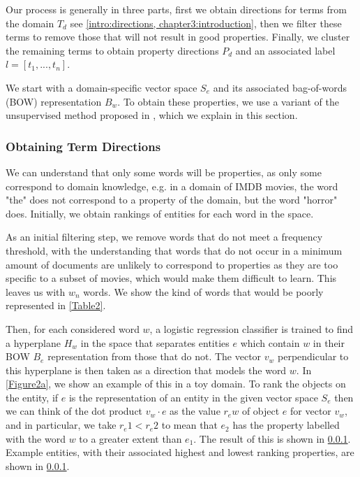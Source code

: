 Our process is generally in three parts, first we obtain directions for terms from the domain $T_d$ see \ref{intro:directions, chapter3:introduction}, then we filter these terms to remove those that will not result in good properties. Finally, we cluster the remaining terms to obtain property directions $P_d$ and an associated label $l = [t_1, ..., t_n]$. 





We start with a domain-specific vector space $S_e$ and its associated bag-of-words (BOW) representation $B_w$. To obtain these properties, we use a variant of the unsupervised method proposed in \cite{derracAIJ}, which we explain in this section. 
\subsubsection{Obtaining Term Directions}
We can understand that only some words will be properties, as only some correspond to domain knowledge, e.g. in a domain of IMDB movies, the word "the" does not correspond to a property of the domain, but the word "horror" does. Initially, we obtain rankings of entities for each word in the space. 

As an initial filtering step, we remove words that do not meet a frequency threshold, with the understanding that words that do not occur in a minimum amount of documents are unlikely to correspond to properties as they are too specific to a subset of movies, which would make them difficult to learn. This leaves us with $w_n$ words. We show the kind of words that would be poorly represented  in \ref{Table2}.%

Then, for each considered word $w$, a logistic regression classifier is trained to find a hyperplane $H_w$ in the space that separates entities $e$ which contain $w$ in their BOW $B_e$ representation from those that do not. %
The vector $v_w$ perpendicular to this hyperplane is then taken as a direction that models the word $w$. In \ref{Figure2a}, we show an example of this in a toy domain. %
To rank the objects on the entity, if $e$ is the representation of an entity in the given vector space $S_e$ then we can think of the dot product $v_w \cdot e$ as the value $r_ew$ of object $e$ for vector $v_w$, and in particular, we take $r_e1 < r_e2$ to mean that $e_2$ has the property labelled with the word $w$ to a greater extent than $e_1$. The result of this is shown in \ref{}. Example entities, with their associated highest and lowest ranking properties, are shown in \ref{}. %

